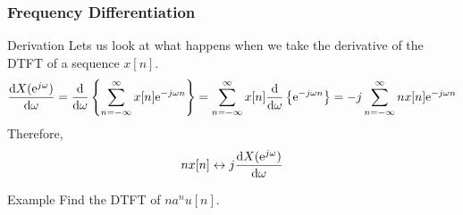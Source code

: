 \documentclass[mathserif,9pt,handout]{beamer}
\def\d{\mathrm{d}}
\begin{document}
\begin{frame}\frametitle{Frequency Differentiation}\small
  
  \begin{exampleblock}{\small Derivation}
  Lets us look at what happens when we take the derivative of the DTFT of a sequence $x[n]$. 
  \begin{align}
    \frac{\d X(\e^{j\omega})}{\d \omega} = \frac{\d}{\d\omega}\left\{\sum_{n=-\infty}^{\infty} x[n] \e^{-j\omega n}\right\} 
    = \sum_{n=-\infty}^{\infty} x[n] \frac{\d}{\d\omega}\left\{\e^{-j\omega n}\right\}
    = -j \sum_{n=-\infty}^{\infty} n x[n] \e^{-j\omega n} \nonumber
  \end{align}
  Therefore,
  \begin{align}
    n x[n] \leftrightarrow j \frac{\d X(\e^{j\omega})}{\d\omega}
          \nonumber 
  \end{align}
  \end{exampleblock}
  
  \begin{block}{\small Example}
    Find the DTFT of $n a^n u[n]$.
  \end{block}
\end{frame}
\end{document}
